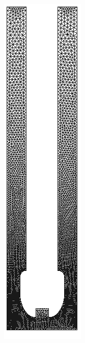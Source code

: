 \begin{figure}[H]
\begin{subfigure}[b]{0.1\linewidth}
		\includegraphics[width=\linewidth]{img/lisa.png}

\end{subfigure}
\end{figure}
